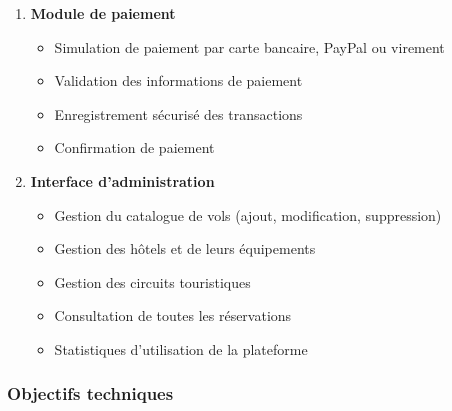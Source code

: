 \documentclass[12pt,a4paper]{report}
\begin{document}
\begin{enumerate}
    \item \textbf{Module de paiement}
    \begin{itemize}
        \item Simulation de paiement par carte bancaire, PayPal ou virement
        \item Validation des informations de paiement
        \item Enregistrement sécurisé des transactions
        \item Confirmation de paiement
    \end{itemize}
    
    \item \textbf{Interface d'administration}
    \begin{itemize}
        \item Gestion du catalogue de vols (ajout, modification, suppression)
        \item Gestion des hôtels et de leurs équipements
        \item Gestion des circuits touristiques
        \item Consultation de toutes les réservations
        \item Statistiques d'utilisation de la plateforme
    \end{itemize}
\end{enumerate}

\subsubsection{Objectifs techniques}
\end{document}
